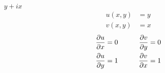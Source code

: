 \item[22.] $y+ix$
\begin{align*}
    u(x,y) &= y \\
    v(x,y) &= x
\end{align*}
\begin{align*}
    \frac{\partial u}{\partial x}  &= 0 
    &\qquad 
    \frac{\partial v}{\partial y}  &= 0 \\
    \frac{\partial u}{\partial y}  &= 1
    &\qquad 
    \frac{\partial v}{\partial x}  &= 1
\end{align*}
